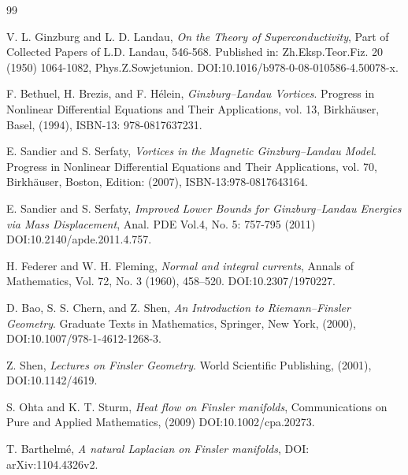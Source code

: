 \documentclass[fleqn,11pt,twoside]{article}
\theoremstyle{definition}
\begin{document}
\begin{thebibliography}{99}


V. L. Ginzburg and L. D. Landau,
\emph{On the Theory of Superconductivity},
Part of Collected Papers of L.D. Landau, 546-568.
Published in: Zh.Eksp.Teor.Fiz. 20 (1950) 1064-1082, Phys.Z.Sowjetunion.
DOI:10.1016/b978-0-08-010586-4.50078-x.

F. Bethuel, H. Brezis, and F. H\'elein,
\emph{Ginzburg--Landau Vortices}.
Progress in Nonlinear Differential Equations and Their Applications, vol. 13,
Birkh\"auser, Basel, (1994), 
ISBN-13: 978-0817637231.

E. Sandier and S. Serfaty,
\emph{Vortices in the Magnetic Ginzburg--Landau Model}.
Progress in Nonlinear Differential Equations and Their Applications, vol. 70,
Birkh\"auser, Boston, Edition: (2007),
ISBN-13:978-0817643164.


E. Sandier and S. Serfaty,
\emph{Improved Lower Bounds for Ginzburg--Landau Energies via Mass Displacement},
Anal. PDE Vol.4, No. 5: 757-795 (2011)
DOI:10.2140/apde.2011.4.757.


H. Federer and W. H. Fleming,
\emph{Normal and integral currents},
Annals of Mathematics, Vol. 72, No. 3 (1960), 458--520.
DOI:10.2307/1970227.

D. Bao, S. S. Chern, and Z. Shen,
\emph{An Introduction to Riemann--Finsler Geometry}.
Graduate Texts in Mathematics,
Springer, New York, (2000),
DOI:10.1007/978-1-4612-1268-3.

Z. Shen,
\emph{Lectures on Finsler Geometry}.
World Scientific Publishing, (2001),
DOI:10.1142/4619.

S. Ohta and K. T. Sturm,
\emph{Heat flow on Finsler manifolds},
Communications on Pure and Applied Mathematics, (2009)
DOI:10.1002/cpa.20273.

T. Barthelm\'e,
\emph{A natural Laplacian on Finsler manifolds},
DOI: arXiv:1104.4326v2. 

\end{thebibliography}\label{lastpage}
\end{document}
